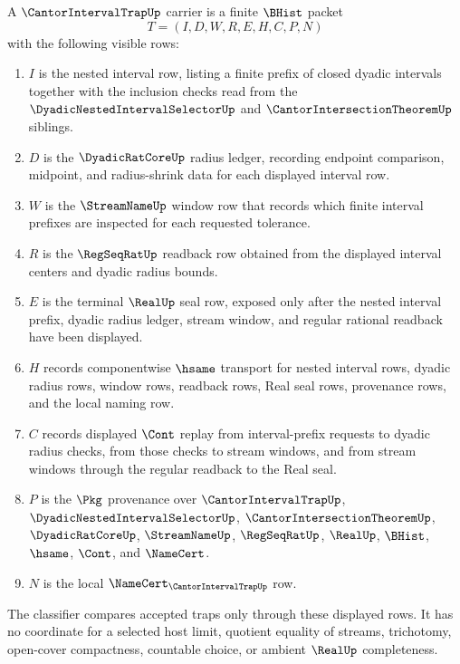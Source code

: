 \begin{definition}
\label{def:cantor-interval-trap-carrier}
A $\CantorIntervalTrapUp$ carrier is a finite $\BHist$ packet
$$
T=(I,D,W,R,E,H,C,P,N)
$$
with the following visible rows:
\begin{enumerate}
\item $I$ is the nested interval row, listing a finite prefix of closed dyadic intervals together with the inclusion checks read from the $\DyadicNestedIntervalSelectorUp$ and $\CantorIntersectionTheoremUp$ siblings.
\item $D$ is the $\DyadicRatCoreUp$ radius ledger, recording endpoint comparison, midpoint, and radius-shrink data for each displayed interval row.
\item $W$ is the $\StreamNameUp$ window row that records which finite interval prefixes are inspected for each requested tolerance.
\item $R$ is the $\RegSeqRatUp$ readback row obtained from the displayed interval centers and dyadic radius bounds.
\item $E$ is the terminal $\RealUp$ seal row, exposed only after the nested interval prefix, dyadic radius ledger, stream window, and regular rational readback have been displayed.
\item $H$ records componentwise $\hsame$ transport for nested interval rows, dyadic radius rows, window rows, readback rows, Real seal rows, provenance rows, and the local naming row.
\item $C$ records displayed $\Cont$ replay from interval-prefix requests to dyadic radius checks, from those checks to stream windows, and from stream windows through the regular readback to the Real seal.
\item $P$ is the $\Pkg$ provenance over $\CantorIntervalTrapUp$, $\DyadicNestedIntervalSelectorUp$, $\CantorIntersectionTheoremUp$, $\DyadicRatCoreUp$, $\StreamNameUp$, $\RegSeqRatUp$, $\RealUp$, $\BHist$, $\hsame$, $\Cont$, and $\NameCert$.
\item $N$ is the local $\NameCert_{\CantorIntervalTrapUp}$ row.
\end{enumerate}
The classifier compares accepted traps only through these displayed rows. It has no coordinate for a selected host limit, quotient equality of streams, trichotomy, open-cover compactness, countable choice, or ambient $\RealUp$ completeness.
\end{definition}

